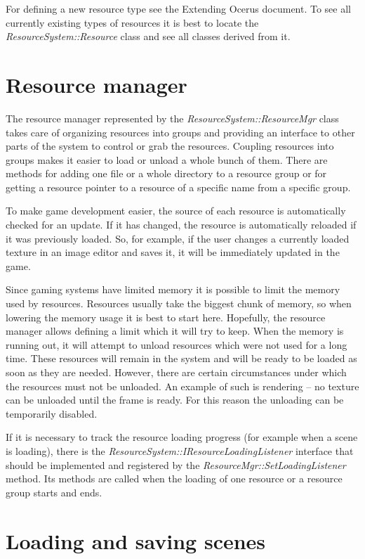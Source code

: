 \documentclass[a4paper, 12pt]{report}
\begin{document}
For defining a new resource type see the Extending Ocerus document. To see all currently existing types of resources it is best to locate the \emph{ResourceSystem::Resource} class and see all classes derived from it.

\section{Resource manager}

The resource manager represented by the \emph{ResourceSystem::ResourceMgr} class takes care of organizing resources into groups and providing an interface to other parts of the system to control or grab the resources. Coupling resources into groups makes it easier to load or unload a whole bunch of them. There are methods for adding one file or a whole directory to a resource group or for getting a resource pointer to a resource of a specific name from a specific group.

To make game development easier, the source of each resource is automatically checked for an update. If it has changed, the resource is automatically reloaded if it was previously loaded. So, for example, if the user changes a currently loaded texture in an image editor and saves it, it will be immediately updated in the game.

Since gaming systems have limited memory it is possible to limit the memory used by resources. Resources usually take the biggest chunk of memory, so when lowering the memory usage it is best to start here. Hopefully, the resource manager allows defining a limit which it will try to keep. When the memory is running out, it will attempt to unload resources which were not used for a long time. These resources will remain in the system and will be ready to be loaded as soon as they are needed. However, there are certain circumstances under which the resources must not be unloaded. An example of such is rendering -- no texture can be unloaded until the frame is ready. For this reason the unloading can be temporarily disabled.

If it is necessary to track the resource loading progress (for example when a scene is loading), there is the \emph{ResourceSystem::IResourceLoadingListener} interface that should be implemented and registered by the \emph{ResourceMgr\-::\-Set\-Loading\-Listener} method. Its methods are called when the loading of one resource or a resource group starts and ends.

\section{Loading and saving scenes}
\end{document}

